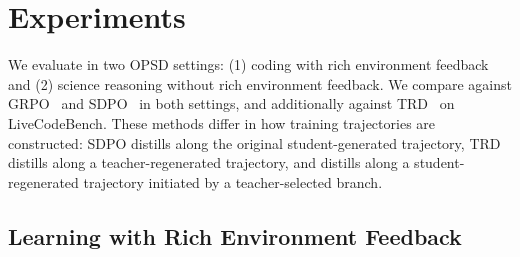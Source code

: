 \section{Experiments}
\label{sec:experiments}

We evaluate \method{} in two OPSD settings: (1) coding with rich environment feedback and (2) science reasoning without rich environment feedback. We compare against GRPO~\citep{shao2024deepseekmath} and SDPO~\citep{hubotter2026sdpo} in both settings, and additionally against TRD~\citep{jiang2026trajectory} on LiveCodeBench. These methods differ in how training trajectories are constructed: SDPO distills along the original student-generated trajectory, TRD distills along a teacher-regenerated trajectory, and \method{} distills along a student-regenerated trajectory initiated by a teacher-selected branch.







































































\subsection{Learning with Rich Environment Feedback}

